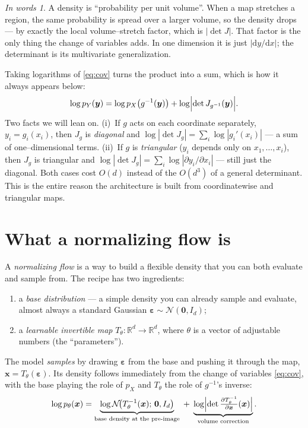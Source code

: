 \documentclass[11pt]{article}
\newcommand{\R}{\mathbb{R}}
\newcommand{\Ncal}{\mathcal{N}}
\newcommand{\x}{\bm{x}}
\newcommand{\yy}{\bm{y}}
\newcommand{\eps}{\bm{\varepsilon}}
\theoremstyle{remark}
\newtheorem*{plain}{In words}
\begin{document}
\begin{plain}
A density is ``probability per unit volume''. When a map stretches a region, the
same probability is spread over a larger volume, so the density drops --- by
exactly the local volume--stretch factor, which is $|\det J|$. That factor is the
only thing the change of variables adds. In one dimension it is just
$|\mathrm{d}y/\mathrm{d}x|$; the determinant is its multivariate generalization.
\end{plain}

Taking logarithms of \eqref{eq:cov} turns the product into a sum, which is how it
always appears below:
\begin{equation}
\label{eq:logcov}
\log p_Y(\yy) = \log p_X\bigl(g^{-1}(\yy)\bigr) + \log\Bigl|\det J_{g^{-1}}(\yy)\Bigr| .
\end{equation}
Two facts we will lean on. (i)~If $g$ acts on each coordinate separately,
$y_i=g_i(x_i)$, then $J_g$ is \emph{diagonal} and
$\log|\det J_g|=\sum_i\log|g_i'(x_i)|$ --- a sum of one--dimensional terms.
(ii)~If $g$ is \emph{triangular} ($y_i$ depends only on $x_1,\dots,x_i$), then
$J_g$ is triangular and $\log|\det J_g|=\sum_i\log|\partial y_i/\partial x_i|$ ---
still just the diagonal. Both cases cost $O(d)$ instead of the $O(d^3)$ of a
general determinant. This is the entire reason the architecture is built from
coordinatewise and triangular maps.

\section{What a normalizing flow is}
\label{sec:flow-intro}

A \emph{normalizing flow} is a way to build a flexible density that you can both
evaluate and sample from. The recipe has two ingredients:
\begin{enumerate}
\item a \emph{base distribution} --- a simple density you can already sample and
      evaluate, almost always a standard Gaussian $\eps\sim\Ncal(\bm0,I_d)$;
\item a \emph{learnable invertible map} $T_\theta:\R^d\to\R^d$, where $\theta$ is
      a vector of adjustable numbers (the ``parameters'').
\end{enumerate}
The model \emph{samples} by drawing $\eps$ from the base and pushing it through
the map, $\x=T_\theta(\eps)$. Its density follows immediately from the change of
variables \eqref{eq:cov}, with the base playing the role of $p_X$ and $T_\theta$
the role of $g^{-1}$'s inverse:
\begin{equation}
\label{eq:flow-density}
\log p_\theta(\x)
= \underbrace{\log\Ncal\!\bigl(T_\theta^{-1}(\x);\,\bm0,I_d\bigr)}_{\text{base density at the pre-image}}
\;+\;
\underbrace{\log\Bigl|\det \tfrac{\partial T_\theta^{-1}}{\partial\x}(\x)\Bigr|}_{\text{volume correction}} .
\end{equation}
\end{document}
